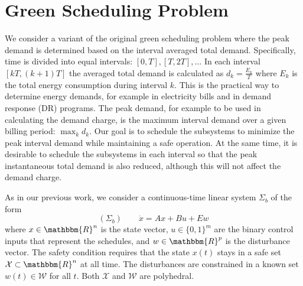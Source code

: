 \section{Green Scheduling Problem}


We consider a variant of the original green scheduling problem where the peak
demand is determined based on the interval averaged total demand.
Specifically, time is divided into equal intervals: $[0, T], [T, 2 T], \ldots$
In each interval $[kT, (k + 1) T]$ the averaged total demand is calculated as $d_k = \frac{E_k}{T}$ where $E_k$ is the total energy consumption during interval $k$.
This is the practical way to determine energy demands, for example in electricity bills and in demand response (DR) programs.
The peak demand, for example to be used in calculating the demand charge, is the maximum interval demand over a given billing period: $\max_k d_k$.
Our goal is to schedule the subsystems to minimize the peak interval demand while maintaining a safe operation.
At the same time, it is desirable to schedule the subsystems in each interval so that the peak instantaneous total demand is also reduced, although this will not affect the demand charge.

As in our previous work, we consider a continuous-time linear system $\Sigma_b$ of the form
%
\begin{equation*}
(\Sigma_b) \hspace{2em} \dot{x} = Ax + Bu + Ew
\end{equation*}
%
where $x \in \mathbbm{R}^n$ is the state vector, $u \in \{ 0, 1 \}^m$ are the binary control inputs that represent the schedules, and $w \in \mathbbm{R}^p$ is the disturbance vector.
The safety condition requires that the state $x (t)$ stays in a safe set $\mathcal{X} \subset \mathbbm{R}^n$ at all time.
The disturbances are constrained in a known set $w (t) \in \mathcal{W}$ for all $t$.
Both $\mathcal{X}$ and $\mathcal{W}$ are polyhedral.

